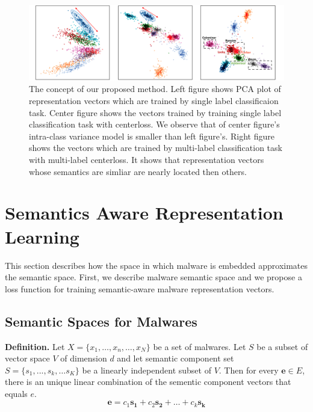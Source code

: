 \begin{figure}[!htb] %
  \includegraphics[width=\textwidth]{../../figures/concept.pdf}
  \caption{The concept of our proposed method. Left figure shows PCA plot of representation vectors which are trained by single label classificaion task. Center figure shows the vectors trained by training single label classification task with centerloss. We observe that of center figure's intra-class variance model is smaller than left figure's.
  Right figure shows the vectors which are trained by multi-label classification task with multi-label centerloss. It shows that representation vectors whose semantics are simliar are nearly located then others. 
%  
  }
  \label{fig:concept}
\end{figure}

\section{Semantics Aware Representation Learning}
This section describes how the space in which malware is embedded approximates the semantic space. First, we describe malware semantic space and we propose a loss function for training semantic-aware malware representation vectors.

\subsection{Semantic Spaces for Malwares}

\textbf{Definition. }
Let $X = \{x_1, …, x_n, …, x_N\}$ be a set of malwares.
Let $S$ be a subset of vector space $V$ of dimension $d$ and let semantic component set $S = \{s_1, ... , s_k, … s_K\}$ be a linearly independent subset of $V$.  
Then for every $\mathbf{e} \in E$, there is an unique linear combination of the sementic component vectors that equals $e$.
\[
\mathbf{e} = c_1\mathbf{s_1} + c_2\mathbf{s_2} + … + c_k\mathbf{s_k} 
\]


